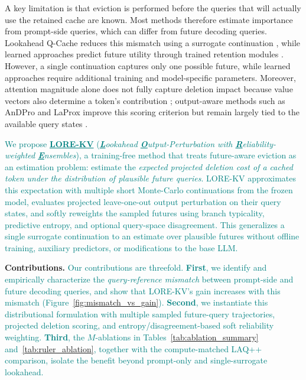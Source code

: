 \documentclass{article} %
\begin{document}
A key limitation is that eviction is performed before the queries that will actually use the retained cache are known. Most methods therefore estimate importance from prompt-side queries, which can differ from future decoding queries. Lookahead Q-Cache reduces this mismatch using a surrogate continuation \citep{wang2025lookahead}, while learned approaches predict future utility through trained retention modules \citep{ahn2026lookaheadkv,moschella2026learning,bui2026make,yang2026indexmem}. However, a single continuation captures only one possible future, while learned approaches require additional training and model-specific parameters. Moreover, attention magnitude alone does not fully capture deletion impact because value vectors also determine a token's contribution \citep{guo2024criticalkv}; output-aware methods such as AnDPro and LaProx improve this scoring criterion but remain largely tied to the available query states \citep{geng2026accurate,mai2026reformulating}.

\textcolor{teal}{We propose \textbf{\underline{LORE-KV}} (\emph{\textbf{\underline{L}}ookahead \textbf{\underline{O}}utput-Perturbation with \textbf{\underline{R}}eliability-weighted \textbf{\underline{E}}nsembles}), a training-free method that treats future-aware eviction as an estimation problem: estimate the \emph{expected projected deletion cost of a cached token under the distribution of plausible future queries}. LORE-KV approximates this expectation with multiple short Monte-Carlo continuations from the frozen model, evaluates projected leave-one-out output perturbation on their query states, and softly reweights the sampled futures using branch typicality, predictive entropy, and optional query-space disagreement. This generalizes a single surrogate continuation to an estimate over plausible futures without offline training, auxiliary predictors, or modifications to the base LLM.}



\textbf{Contributions.}
\textcolor{teal}{Our contributions are threefold. \textbf{First}, we identify and empirically characterize the \emph{query-reference mismatch} between prompt-side and future decoding queries, and show that LORE-KV's gain increases with this mismatch (Figure~\ref{fig:mismatch_vs_gain}). \textbf{Second}, we instantiate this distributional formulation with multiple sampled future-query trajectories, projected deletion scoring, and entropy/disagreement-based soft reliability weighting. \textbf{Third}, the $M$-ablations in Tables~\ref{tab:ablation_summary} and~\ref{tab:ruler_ablation}, together with the compute-matched LAQ++ comparison, isolate the benefit beyond prompt-only and single-surrogate lookahead.}
\end{document}
